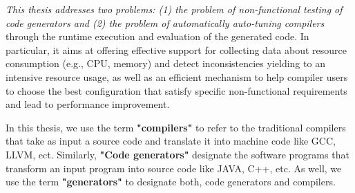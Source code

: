 \textit{This thesis addresses two problems: (1) the problem of non-functional testing of code generators and (2) the problem of automatically auto-tuning compilers} through the runtime execution and evaluation of the generated code. 
In particular, it aims at offering effective support for collecting data about resource consumption (e.g., CPU, memory) and detect inconsistencies yielding to an intensive resource usage, as well as an efficient mechanism to help compiler users to choose the best configuration that satisfy specific non-functional requirements and lead to performance improvement.

In this thesis, we use the term \textbf{"compilers"} to refer to the traditional compilers that take as input a source code and translate it into machine code like GCC, LLVM, ect. Similarly, \textbf{"Code generators"} designate the software programs that transform an input program into source code like JAVA, C++, etc. As well, we use the term \textbf{"generators"} to designate both, code generators and compilers. 

